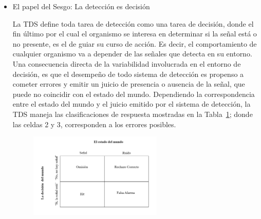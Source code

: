 \begin{itemize}
\begin{itemize}
algunos de los cuales pueden llegar a producir una evidencia similar a la de nuestra señal y ser, por tanto, confundidos con la misma. Esta idea se representa en la Figura 1 con la distribución normal negra identificada bajo el nombre de ruido, que se traslapa con cierta probabilidad con la distribución de señal.\\


El soporte de las distribuciones, identificado en la Figura 1 bajo el nombre de ‘Evidencia’ rara vez se define con precisión,  teniendo una concepción más bien abstracta; La idea general es que cuando queremos detectar una señal particular, comenzamos a recolectar un tipo de evidencia específico a la tarea ante la que nos encontramos. Lo más importante, es que la señal siempre va a estar asociada en mayor medida con dicha evidencia, distribuyéndose siempre en valores situados por encima (a la derecha, en la Figura 1) del ruido.\\


     \end{itemize}
 
  \item{El papel del Sesgo: La detección es decisión}

La TDS define toda tarea de detección como una tarea de decisión, donde el fin último por el cual el organismo se interesa en determinar si la señal está o no presente, es el de guiar su curso de acción. Es decir, el comportamiento de cualquier organismo va a depender de las señales que detecta en su entorno.\\

Una consecuencia directa de la variabilidad involucrada en el entorno de decisión, es que el desempeño de todo sistema de detección es propenso a cometer errores y emitir un juicio de presencia o ausencia de la señal, que puede no coincidir con el estado del mundo. Dependiendo la correspondencia entre el estado del mundo y el juicio emitido por el sistema de detección, la TDS maneja las clasificaciones de respuesta mostradas en la Tabla~\ref{fig:Mat_Output}; donde las celdas 2 y 3, corresponden a los errores posibles.\\

\begin{figure}[th]
\centering
\includegraphics[width=0.60\textwidth]{Figures/Matriz_Outputs} 
\caption[Posibles Resultados a obtener en una Tarea de Detección]{}
\label{fig:Mat_Output}
\end{figure}


\end{itemize}
